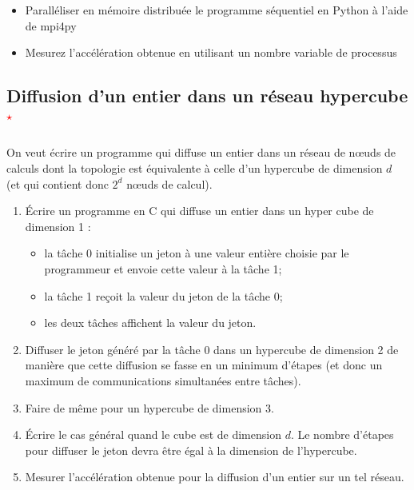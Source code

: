 \documentclass[11pt,a4paper]{article}
\begin{document}
\begin{itemize}
\item Paralléliser en mémoire distribuée le programme séquentiel en Python à l'aide de mpi4py
\item Mesurez l'accélération obtenue en utilisant un nombre variable de processus
\end{itemize}

\subsection{Diffusion d'un entier dans un réseau hypercube\textcolor{red}{$^{\star}$}}

On veut écrire un programme qui diffuse un entier dans un réseau de n{\oe}uds de calculs dont la topologie
est équivalente à celle d'un hypercube de dimension $d$ (et qui contient donc $2^{d}$ n{\oe}uds de calcul).

\begin{enumerate}
\item \'Ecrire un programme en C qui diffuse un entier dans un hyper cube de dimension 1 :
\begin{itemize}
\item la tâche 0 initialise un jeton à une valeur entière choisie par le programmeur et envoie cette valeur 
à la tâche 1; 
\item la tâche 1 reçoit la valeur du jeton de la tâche 0;
\item les deux tâches affichent la valeur du jeton.
\end{itemize}
\item Diffuser le jeton généré par la tâche 0 dans un hypercube de dimension 2 de manière que cette diffusion se fasse en un minimum
d'étapes (et donc un maximum de communications simultanées entre tâches).
\item Faire de même pour un hypercube de dimension 3.
\item \'Ecrire le cas général quand le cube est de dimension $d$. Le nombre d'étapes pour diffuser le jeton devra
être égal à la dimension de l'hypercube.
\item Mesurer l'accélération obtenue pour la diffusion d'un entier sur un tel réseau.
\end{enumerate}
\end{document}
